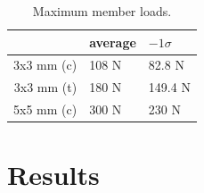 \documentclass[12pt]{article}
\begin{document}
		\begin{table}[h!]
			\caption{Maximum member loads.}
			\begin{center}
			\begin{tabular}{ | r | l | l | }
				\hline
				& average & $-1\sigma$ \\ \hline
				3x3 mm (c) & 108 N & 82.8 N \\ \hline
				3x3 mm (t) & 180 N & 149.4 N \\ \hline
				5x5 mm (c) & 300 N & 230 N \\ \hline
			\end{tabular}
			\end{center}
			\label{maxloads}
		\end{table}


	\section{Results}


	
\end{document}
